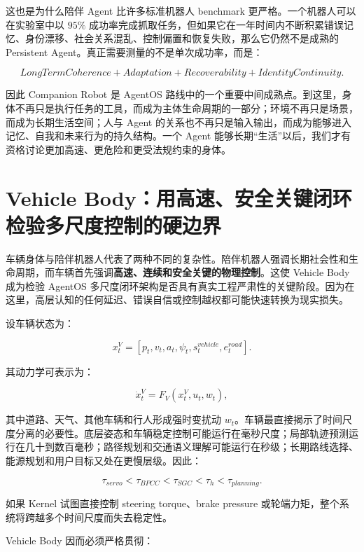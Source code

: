 这也是为什么陪伴 Agent 比许多标准机器人 benchmark 更严格。一个机器人可以在实验室中以 $95\%$ 成功率完成抓取任务，但如果它在一年时间内不断积累错误记忆、身份漂移、社会关系混乱、控制偏置和恢复失败，那么它仍然不是成熟的 Persistent Agent。真正需要测量的不是单次成功率，而是：

$$
\boxed{
LongTermCoherence
+
Adaptation
+
Recoverability
+
IdentityContinuity.
}
$$

因此 Companion Robot 是 AgentOS 路线中的一个重要中间成熟点。到这里，身体不再只是执行任务的工具，而成为主体生命周期的一部分；环境不再只是场景，而成为长期生活空间；人与 Agent 的关系也不再只是输入输出，而成为能够进入记忆、自我和未来行为的持久结构。一个 Agent 能够长期“生活”以后，我们才有资格讨论更加高速、更危险和更受法规约束的身体。

\section{Vehicle Body：用高速、安全关键闭环检验多尺度控制的硬边界}

车辆身体与陪伴机器人代表了两种不同的复杂性。陪伴机器人强调长期社会性和生命周期，而车辆首先强调\textbf{高速、连续和安全关键的物理控制}。这使 Vehicle Body 成为检验 AgentOS 多尺度闭环架构是否具有真实工程严肃性的关键阶段。因为在这里，高层认知的任何延迟、错误自信或控制越权都可能快速转换为现实损失。

设车辆状态为：

$$
x_t^V=
[
p_t,v_t,a_t,\psi_t,
s_t^{vehicle},
e_t^{road}
].
$$

其动力学可表示为：

$$
\dot x_t^V
=
F_V(x_t^V,u_t,w_t),
$$

其中道路、天气、其他车辆和行人形成强时变扰动 $w_t$。车辆最直接揭示了时间尺度分离的必要性。底层姿态和车辆稳定控制可能运行在毫秒尺度；局部轨迹预测运行在几十到数百毫秒；路径规划和交通语义理解可能运行在秒级；长期路线选择、能源规划和用户目标又处在更慢层级。因此：

$$
\tau_{servo}
<
\tau_{BPCC}
<
\tau_{SGC}
<
\tau_h
<
\tau_{planning}.
$$

如果 Kernel 试图直接控制 steering torque、brake pressure 或轮端力矩，整个系统将跨越多个时间尺度而失去稳定性。

Vehicle Body 因而必须严格贯彻：

\begin{statementbox}
\centering
{}
\end{statementbox}

